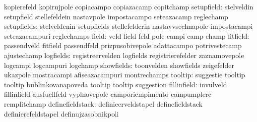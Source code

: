                                   kopierefeld                      kopirujpole
                                  copiacampo                       copiazacamp
                                  copitchamp
                      setupfield: stelveldin                       setupfield
                                  stellefeldein                    nastavpole
                                  impostacampo                     seteazacamp
                                  reglechamp
                     setupfields: stelveldenin                     setupfields
                                  stellefelderin                   nastavvsechnapole
                                  impostacampi                     seteazacampuri
                                  reglechamps
                           field: veld                             field
                                  feld                             pole
                                  campi                            camp
                                  champ
                        fitfield: passendveld                      fitfield
                                  passendfeld                      prizpusobivepole %
                                  adattacampo                      potrivestecamp
                                  ajustechamp
                       logfields: registreervelden                 logfields
                                  registrierefelder                zaznamovepole
                                  logcampi                         logcampuri
                                  logchamp
                      showfields: toonvelden                       showfields
                                  zeigefelder                      ukazpole
                                  mostracampi                      afiseazacampuri
                                  montrechamps
                         tooltip: suggestie                        tooltip
                                  tooltip                          bublinkovanapoveda
                                  tooltip                          tooltip
                                  suggestion
                     fillinfield: invulveld                        fillinfield
                                  ausfuellfeld                     vyplnovepole
                                  camporiempimento                 campumplere
                                  remplitchamp
                definefieldstack: definieerveldstapel              definefieldstack
                                  definierefeldstapel              definujzasobnikpoli
